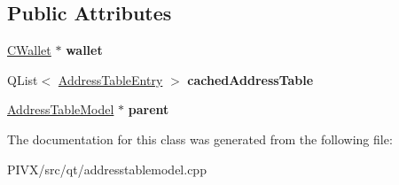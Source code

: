 \subsection*{Public Attributes}
\begin{DoxyCompactItemize}
\item 
\mbox{\label{class_address_table_priv_ad3506d642e5546251e76fbf0d75b2aca}} 
\mbox{\hyperlink{class_c_wallet}{C\+Wallet}} $\ast$ {\bfseries wallet}
\item 
\mbox{\label{class_address_table_priv_a0ef3118dd421927db0ba41e2a27c40c7}} 
Q\+List$<$ \mbox{\hyperlink{struct_address_table_entry}{Address\+Table\+Entry}} $>$ {\bfseries cached\+Address\+Table}
\item 
\mbox{\label{class_address_table_priv_ab0b98e86cab673315860630eafbd6561}} 
\mbox{\hyperlink{class_address_table_model}{Address\+Table\+Model}} $\ast$ {\bfseries parent}
\end{DoxyCompactItemize}


The documentation for this class was generated from the following file\+:\begin{DoxyCompactItemize}
\item 
P\+I\+V\+X/src/qt/addresstablemodel.\+cpp\end{DoxyCompactItemize}
